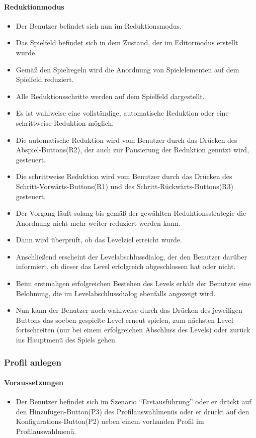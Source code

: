 \paragraph{Reduktionmodus}
\begin{itemize}
	\item Der Benutzer befindet sich nun im Reduktionsmodus.
	\item Das Spielfeld befindet sich in dem Zustand, der im Editormodus erstellt wurde.
	\item Gemäß den Spielregeln wird die Anordnung von Spielelementen auf dem Spielfeld reduziert.
	\item Alle Reduktionsschritte werden auf dem Spielfeld dargestellt.
	\item Es ist wahlweise eine vollständige, automatische Reduktion oder eine schrittweise Reduktion möglich.
	\item Die automatische Reduktion wird vom Benutzer durch das Drücken des Abspiel-Buttons(R2), der auch zur Pausierung der Reduktion genutzt wird, gesteuert.
	\item Die schrittweise Reduktion wird vom Benutzer durch das Drücken des Schritt-Vorwärts-Buttons(R1) und des Schritt-Rückwärts-Buttons(R3) gesteuert.
	\item Der Vorgang läuft solang bis gemäß der gewählten Reduktionsstrategie die Anordnung nicht mehr weiter reduziert werden kann.
	\item Dann wird überprüft, ob das Levelziel erreicht wurde.
	\item Anschließend erscheint der Levelabschlussdialog, der den Benutzer darüber informiert, ob dieser das Level erfolgreich abgeschlossen hat oder nicht.
	\item Beim erstmaligen erfolgreichen Bestehen des Levels erhält der Benutzer eine Belohnung, die im Levelabschlussdialog ebenfalls angezeigt wird.
	\item Nun kann der Benutzer noch wahlweise durch das Drücken des jeweiligen Buttons das soeben gespielte Level erneut spielen, zum nächsten Level fortschreiten (nur bei einem erfolgreichen Abschluss des Levels) oder zurück ins Hauptmenü des Spiels gehen.
\end{itemize}

\subsubsection{Profil anlegen}
\paragraph{Voraussetzungen}
\begin{itemize}
	\item Der Benutzer befindet sich im Szenario "`Erstausführung"' oder er drückt auf den Hinzufügen-Button(P3) des Profilauswahlmenüs oder er drückt auf den Konfigurations-Button(P2) neben einem vorhanden Profil im Profilauswahlmenü.
\end{itemize}
